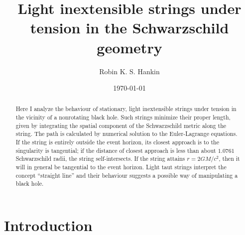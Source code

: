 \documentclass[prb,preprint]{revtex4-1}
\begin{document}

\title{Light inextensible strings under tension in the Schwarzschild geometry}

\author{Robin K. S. Hankin}



\date{\today}

\begin{abstract}
Here I analyze the behaviour of stationary, light inextensible strings
under tension in the vicinity of a nonrotating black hole.  Such
strings minimize their proper length, given by integrating the spatial
component of the Schwarzschild metric along the string.  The path is
calculated by numerical solution to the Euler-Lagrange equations.  If
the string is entirely outside the event horizon, its closest approach
is to the singularity is tangential; if the distance of closest
approach is less than about $1.0761$ Schwarzschild radii, the
string self-intersects.  If the string attains $r=2GM/c^2$, then it
will in general be tangential to the event horizon.  Light taut
strings interpret the concept ``straight line'' and their behaviour
suggests a possible way of manipulating a black hole.
\end{abstract}

\maketitle %


\section{Introduction} %
\end{document}
